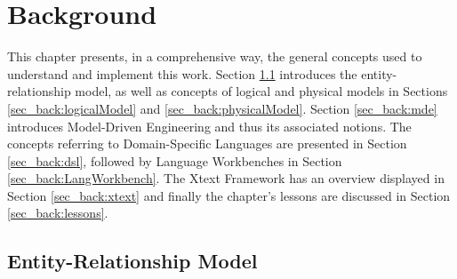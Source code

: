 \chapter{Background}
\label{chap:background}

This chapter presents, in a comprehensive way, the general concepts used to understand and implement this work.
Section \ref{sec_back:erModel} introduces the entity-relationship model, as well as concepts of logical and physical models in Sections \ref{sec_back:logicalModel} and \ref{sec_back:physicalModel}.
Section \ref{sec_back:mde} introduces Model-Driven Engineering and thus its associated notions.
The concepts referring to Domain-Specific Languages are presented in Section \ref{sec_back:dsl}, followed by Language Workbenches in Section \ref{sec_back:LangWorkbench}.
The Xtext Framework has an overview displayed in Section \ref{sec_back:xtext} and finally the chapter's lessons are discussed in Section \ref{sec_back:lessons}.

\section{Entity-Relationship Model}
\label{sec_back:erModel}

